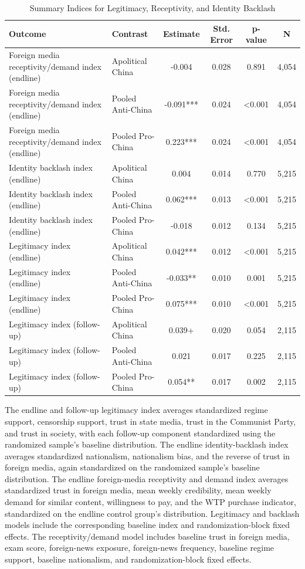 \begin{table}[H]
\centering
\caption{Summary Indices for Legitimacy, Receptivity, and Identity Backlash}
\label{tab:summary_indices}
\footnotesize
\begin{threeparttable}
\begin{tabular}{llcccc}
\toprule
Outcome & Contrast & Estimate & Std. Error & p-value & N \\
\midrule
Foreign media receptivity/demand index (endline) & Apolitical China & -0.004 & 0.028 & 0.891 & 4,054 \\
Foreign media receptivity/demand index (endline) & Pooled Anti-China & -0.091*** & 0.024 & <0.001 & 4,054 \\
Foreign media receptivity/demand index (endline) & Pooled Pro-China & 0.223*** & 0.024 & <0.001 & 4,054 \\
Identity backlash index (endline) & Apolitical China & 0.004 & 0.014 & 0.770 & 5,215 \\
Identity backlash index (endline) & Pooled Anti-China & 0.062*** & 0.013 & <0.001 & 5,215 \\
Identity backlash index (endline) & Pooled Pro-China & -0.018 & 0.012 & 0.134 & 5,215 \\
Legitimacy index (endline) & Apolitical China & 0.042*** & 0.012 & <0.001 & 5,215 \\
Legitimacy index (endline) & Pooled Anti-China & -0.033** & 0.010 & 0.001 & 5,215 \\
Legitimacy index (endline) & Pooled Pro-China & 0.075*** & 0.010 & <0.001 & 5,215 \\
Legitimacy index (follow-up) & Apolitical China & 0.039+ & 0.020 & 0.054 & 2,115 \\
Legitimacy index (follow-up) & Pooled Anti-China & 0.021 & 0.017 & 0.225 & 2,115 \\
Legitimacy index (follow-up) & Pooled Pro-China & 0.054** & 0.017 & 0.002 & 2,115 \\
\bottomrule
\end{tabular}
\begin{tablenotes}[flushleft]
\footnotesize
\item The endline and follow-up legitimacy index averages standardized regime support, censorship support, trust in state media, trust in the Communist Party, and trust in society, with each follow-up component standardized using the randomized sample's baseline distribution. The endline identity-backlash index averages standardized nationalism, nationalism bias, and the reverse of trust in foreign media, again standardized on the randomized sample's baseline distribution. The endline foreign-media receptivity and demand index averages standardized trust in foreign media, mean weekly credibility, mean weekly demand for similar content, willingness to pay, and the WTP purchase indicator, standardized on the endline control group's distribution. Legitimacy and backlash models include the corresponding baseline index and randomization-block fixed effects. The receptivity/demand model includes baseline trust in foreign media, exam score, foreign-news exposure, foreign-news frequency, baseline regime support, baseline nationalism, and randomization-block fixed effects.

\end{tablenotes}
\end{threeparttable}
\end{table}
